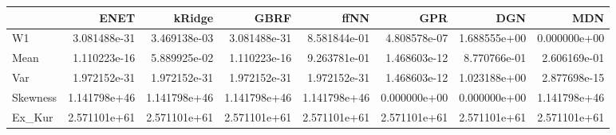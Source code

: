 \begin{tabular}{lrrrrrrr}
\toprule
{} &          ENET &        kRidge &          GBRF &          ffNN &           GPR &           DGN &           MDN \\
\midrule
W1       &  3.081488e-31 &  3.469138e-03 &  3.081488e-31 &  8.581844e-01 &  4.808578e-07 &  1.688555e+00 &  0.000000e+00 \\
Mean     &  1.110223e-16 &  5.889925e-02 &  1.110223e-16 &  9.263781e-01 &  1.468603e-12 &  8.770766e-01 &  2.606169e-01 \\
Var      &  1.972152e-31 &  1.972152e-31 &  1.972152e-31 &  1.972152e-31 &  1.468603e-12 &  1.023188e+00 &  2.877698e-15 \\
Skewness &  1.141798e+46 &  1.141798e+46 &  1.141798e+46 &  1.141798e+46 &  0.000000e+00 &  0.000000e+00 &  1.141798e+46 \\
Ex\_Kur   &  2.571101e+61 &  2.571101e+61 &  2.571101e+61 &  2.571101e+61 &  2.571101e+61 &  2.571101e+61 &  2.571101e+61 \\
\bottomrule
\end{tabular}
